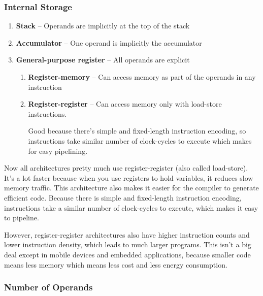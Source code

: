 \documentclass{article}
\begin{document}
\subsubsection{Internal Storage}

\begin{enumerate}
\item \textbf{Stack} -- Operands are implicitly at the top of the stack

\item \textbf{Accumulator} -- One operand is implicitly the accumulator

\item \textbf{General-purpose register} -- All operands are explicit

\begin{enumerate}
\item \textbf{Register-memory} -- Can access memory as part of the operands in any instruction

\item \textbf{Register-register} -- Can access memory only with load-store instructions. 

Good because there's simple and fixed-length instruction encoding, so instructions take similar number of clock-cycles to execute which makes for easy pipelining. 

\end{enumerate}

\end{enumerate}

Now all architectures pretty much use register-register (also called load-store). It's a lot faster because when you use registers to hold variables, it reduces slow  memory traffic. This architecture also makes it easier for the compiler to generate efficient code. Because there is simple and fixed-length instruction encoding, instructions take a similar number of clock-cycles to execute, which makes it easy to pipeline.

However, register-register architectures also have higher instruction counts and lower instruction density, which leads to much larger programs. This isn't a big deal except in mobile devices and embedded applications, because smaller code means less memory which means less cost and less energy consumption.




\subsubsection{Number of Operands}
\end{document}
